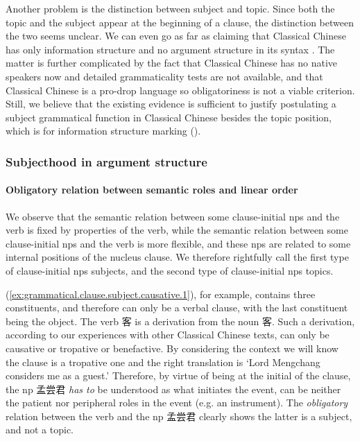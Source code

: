 \documentclass[UTF8, a4paper, oneside, scheme=plain, 12pt]{ctexrep}
\newcommand*{\citepage}[1]{p.~{#1}}
\newcommand{\translate}[1]{`#1'}
\begin{document}
Another problem is the distinction between subject and topic.
Since both the topic and the subject appear at the beginning of a clause,
the distinction between the two seems unclear.
We can even go as far as claiming that 
Classical Chinese has only information structure and no argument structure in its syntax
\citep[\citepage{122}]{meiguang2018}.
The matter is further complicated by the fact that Classical Chinese has no native speakers now
and detailed grammaticality tests are not available,
and that Classical Chinese is a pro-drop language 
so obligatoriness is not a viable criterion.
Still, we believe that the existing evidence is sufficient to justify postulating a subject grammatical function in Classical Chinese
besides the topic position, which is for information structure marking
().

\subsubsection{Subjecthood in argument structure}\label{sec:grammatical.verbal.subject.argument-structure}

\paragraph{Obligatory relation between semantic roles and linear order}

We observe that 
the semantic relation between some clause-initial \ac{np}s and the verb 
is fixed by properties of the verb,
while the semantic relation between some clause-initial \ac{np}s and the verb is more flexible,
and these \acp{np} are related to some internal positions of the nucleus clause.
We therefore rightfully call the first type of clause-initial \acp{np} subjects,
and the second type of clause-initial \acp{np} topics.

(\ref{ex:grammatical.clause.subject.causative.1}), for example, contains three constituents,
and therefore can only be a verbal clause, with the last constituent being the object.
The verb 客 is a derivation from the noun 客.
Such a derivation, according to our experiences with other Classical Chinese texts,
can only be causative or tropative or benefactive.
By considering the context we will know the clause is a tropative one
and the right translation is \translate{Lord Mengchang considers me as a guest.}
Therefore, by virtue of being at the initial of the clause, 
the \ac{np} 孟尝君 \emph{has to} be understood as what initiates the event,
can be neither the patient nor peripheral roles in the event (e.g. an instrument).
The \emph{obligatory} relation between the verb and the \ac{np} 孟尝君 
clearly shows the latter is a subject, and not a topic.
\end{document}
